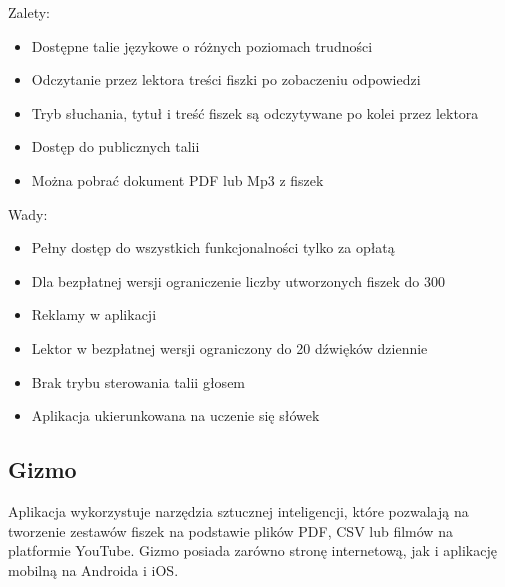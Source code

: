 Zalety:
\begin{itemize}[label=-]
    \item Dostępne talie językowe o różnych poziomach trudności
    \item Odczytanie przez lektora treści fiszki po zobaczeniu odpowiedzi
    \item Tryb słuchania, tytuł i treść fiszek są odczytywane po kolei przez lektora
    \item Dostęp do publicznych talii
    \item Można pobrać dokument PDF lub Mp3 z fiszek
\end{itemize}

Wady:
\begin{itemize}[label=-]
    \item Pełny dostęp do wszystkich funkcjonalności tylko za opłatą
    \item Dla bezpłatnej wersji ograniczenie liczby utworzonych fiszek do 300
    \item Reklamy w aplikacji
    \item Lektor w bezpłatnej wersji ograniczony do 20 dźwięków dziennie
    \item Brak trybu sterowania talii głosem
    \item Aplikacja ukierunkowana na uczenie się słówek
\end{itemize}

\subsection{Gizmo}

Aplikacja wykorzystuje narzędzia sztucznej inteligencji, które pozwalają na tworzenie zestawów fiszek na podstawie plików PDF, CSV lub filmów na platformie YouTube. Gizmo posiada zarówno stronę internetową, jak i aplikację mobilną na Androida i iOS.

